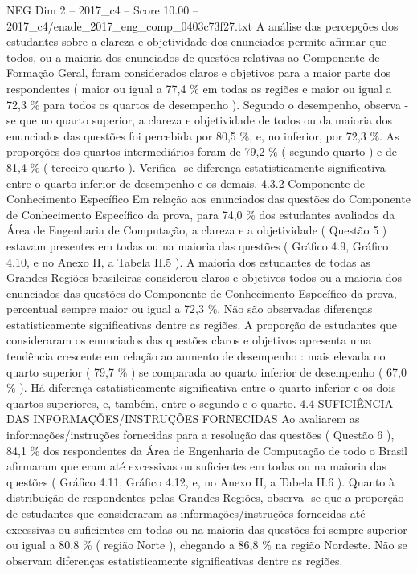 \begin{textsample}{NEG Dim 2 – 2017\_c4 – Score 10.00 – 2017\_c4/enade\_2017\_eng\_comp\_0403c73f27.txt}
A análise das percepções dos estudantes sobre a clareza e objetividade dos enunciados permite afirmar que todos, ou a maioria dos enunciados de questões relativas ao Componente de Formação Geral, foram considerados claros e objetivos para a maior parte dos respondentes ( maior ou igual a 77,4 \% em todas as regiões e maior ou igual a 72,3 \% para todos os quartos de desempenho ).
Segundo o desempenho, observa -se que no quarto superior, a clareza e objetividade de todos ou da maioria dos enunciados das questões foi percebida por 80,5 \%, e, no inferior, por 72,3 \%.
As proporções dos quartos intermediários foram de 79,2 \% ( segundo quarto ) e de 81,4 \% ( terceiro quarto ).
Verifica -se diferença estatisticamente significativa entre o quarto inferior de desempenho e os demais. 4.3.2 Componente de Conhecimento Específico Em relação aos enunciados das questões do Componente de Conhecimento Específico da prova, para 74,0 \% dos estudantes avaliados da Área de Engenharia de Computação, a clareza e a objetividade ( Questão 5 ) estavam presentes em todas ou na maioria das questões ( Gráfico 4.9, Gráfico 4.10, e no Anexo II, a Tabela II.5 ).
A maioria dos estudantes de todas as Grandes Regiões brasileiras considerou claros e objetivos todos ou a maioria dos enunciados das questões do Componente de Conhecimento Específico da prova, percentual sempre maior ou igual a 72,3 \%.
Não são observadas diferenças estatisticamente significativas dentre as regiões.
A proporção de estudantes que consideraram os enunciados das questões claros e objetivos apresenta uma tendência crescente em relação ao aumento de desempenho : mais elevada no quarto superior ( 79,7 \% ) se comparada ao quarto inferior de desempenho ( 67,0 \% ).
Há diferença estatisticamente significativa entre o quarto inferior e os dois quartos superiores, e, também, entre o segundo e o quarto. 4.4 SUFICIÊNCIA DAS INFORMAÇÕES/INSTRUÇÕES FORNECIDAS Ao avaliarem as informações/instruções fornecidas para a resolução das questões ( Questão 6 ), 84,1 \% dos respondentes da Área de Engenharia de Computação de todo o Brasil afirmaram que eram até excessivas ou suficientes em todas ou na maioria das questões ( Gráfico 4.11, Gráfico 4.12, e, no Anexo II, a Tabela II.6 ).
Quanto à distribuição de respondentes pelas Grandes Regiões, observa -se que a proporção de estudantes que consideraram as informações/instruções fornecidas até excessivas ou suficientes em todas ou na maioria das questões foi sempre superior ou igual a 80,8 \% ( região Norte ), chegando a 86,8 \% na região Nordeste.
Não se observam diferenças estatisticamente significativas dentre as regiões.

\end{textsample}
